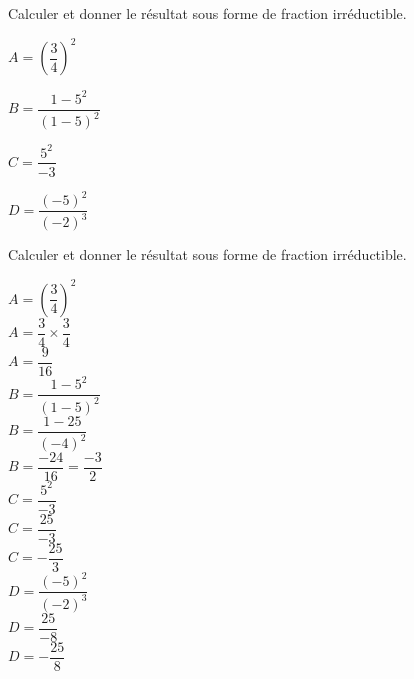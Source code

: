 \begin{exercice*}
    Calculer et donner le résultat sous forme de fraction irréductible.
    \begin{multicols}{2}
        \begin{spacing}{1.5}
            \begin{list}{}{}
                \item $A=\left(\dfrac{3}{4}\right)^2$
                \item $B=\dfrac{1-5^2}{(1-5)^2}$
                \item $C=\dfrac{5^2}{-3}$
                \item $D=\dfrac{(-5)^2}{(-2)^3}$
            \end{list}
        \end{spacing}
    \end{multicols}    
\end{exercice*}
\begin{corrige}
    Calculer et donner le résultat sous forme de fraction irréductible.
    \begin{multicols}{2}
        \begin{spacing}{2}
            \begin{itemize}
                \def\item{}
                \item $A=\left(\dfrac{3}{4}\right)^2$\\
                {\red $A=\dfrac{3}{4}\times\dfrac{3}{4}$\\$A=\dfrac{9}{16}$}\\
                \item $B=\dfrac{1-5^2}{(1-5)^2}$\\
                {\red $B=\dfrac{1-25}{(-4)^2}$\\$B=\dfrac{-24}{16}=\dfrac{-3}{2}$}\\
                \columnbreak
                \item $C=\dfrac{5^2}{-3}$\\
                {\red $C=\dfrac{25}{-3}$\\$C=-\dfrac{25}{3}$}\\
                \item $D=\dfrac{(-5)^2}{(-2)^3}$\\
                {\red $D=\dfrac{25}{-8}$\\$D=-\dfrac{25}{8}$}
            \end{itemize}
        \end{spacing}
    \end{multicols}    
\end{corrige}

